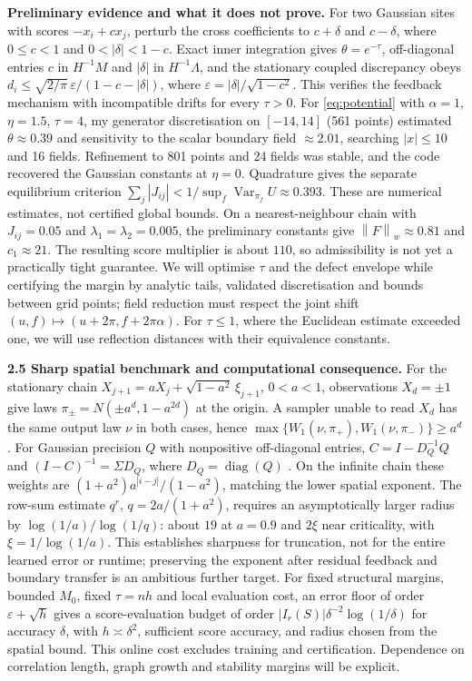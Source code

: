 \documentclass[12pt,a4paper]{article}
\newcommand{\W}{W_1}
\newcommand{\normw}[1]{\left\|#1\right\|_w}
\begin{document}
\textbf{Preliminary evidence and what it does not prove.} For two Gaussian sites with scores $-x_i+cx_j$, perturb the cross coefficients to $c+\delta$ and $c-\delta$, where $0\leq c<1$ and $0<|\delta|<1-c$. Exact inner integration gives $\theta=e^{-\tau}$, off-diagonal entries $c$ in $H^{-1}M$ and $|\delta|$ in $H^{-1}\Lambda$, and the stationary coupled discrepancy obeys $d_i\leq\sqrt{2/\pi}\,\varepsilon/(1-c-|\delta|)$, where $\varepsilon=|\delta|/\sqrt{1-c^2}$. This verifies the feedback mechanism with incompatible drifts for every $\tau>0$.
For \eqref{eq:potential} with $\alpha=1$, $\eta=1.5$, $\tau=4$, my generator discretisation on $[-14,14]$ (561 points) estimated $\theta\approx0.39$ and sensitivity to the scalar boundary field $\approx2.01$, searching $|x|\leq10$ and 16 fields. Refinement to 801 points and 24 fields was stable, and the code recovered the Gaussian constants at $\eta=0$. Quadrature gives the separate equilibrium criterion $\sum_j|J_{ij}|<1/\sup_f\operatorname{Var}_{\pi_f}U\approx0.393$. These are numerical estimates, not certified global bounds.
On a nearest-neighbour chain with $J_{ij}=0.05$ and $\lambda_1=\lambda_2=0.005$, the preliminary constants give $\normw{F}\approx0.81$ and $c_1\approx21$. The resulting score multiplier is about $110$, so admissibility is not yet a practically tight guarantee. We will optimise $\tau$ and the defect envelope while certifying the margin by analytic tails, validated discretisation and bounds between grid points; field reduction must respect the joint shift $(u,f)\mapsto(u+2\pi,f+2\pi\alpha)$. For $\tau\leq1$, where the Euclidean estimate exceeded one, we will use reflection distances with their equivalence constants.

\textbf{2.5 Sharp spatial benchmark and computational consequence.}
For the stationary chain $X_{j+1}=aX_j+\sqrt{1-a^2}\,\xi_{j+1}$, $0<a<1$, observations $X_d=\pm1$ give laws $\pi_\pm=N(\pm a^d,1-a^{2d})$ at the origin. A sampler unable to read $X_d$ has the same output law $\nu$ in both cases, hence $\max\{\W(\nu,\pi_+),\W(\nu,\pi_-)\}\geq a^d$. For Gaussian precision $Q$ with nonpositive off-diagonal entries, $C=I-D_Q^{-1}Q$ and $(I-C)^{-1}=\Sigma D_Q$, where $D_Q=\operatorname{diag}(Q)$ \cite{MJW06}. On the infinite chain these weights are $(1+a^2)a^{|i-j|}/(1-a^2)$, matching the lower spatial exponent. The row-sum estimate $q^r$, $q=2a/(1+a^2)$, requires an asymptotically larger radius by $\log(1/a)/\log(1/q)$: about $19$ at $a=0.9$ and $2\xi$ near criticality, with $\xi=1/\log(1/a)$. This establishes sharpness for truncation, not for the entire learned error or runtime; preserving the exponent after residual feedback and boundary transfer is an ambitious further target.
For fixed structural margins, bounded $M_0$, fixed $\tau=nh$ and local evaluation cost, an error floor of order $\varepsilon+\sqrt h$ gives a score-evaluation budget of order $|I_r(S)|\delta^{-2}\log(1/\delta)$ for accuracy $\delta$, with $h\asymp\delta^2$, sufficient score accuracy, and radius chosen from the spatial bound. This online cost excludes training and certification. Dependence on correlation length, graph growth and stability margins will be explicit.
\end{document}
